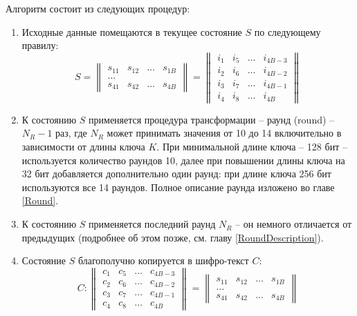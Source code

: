     Алгоритм состоит из следующих процедур:
    \begin{enumerate}
        \item Исходные данные помещаются в текущее состояние $S$ по следующему правилу:
            \begin{equation}
                S =
                \begin{Vmatrix}
                    s_{11} & s_{12} & \dots & s_{1B} \\
                    \dots \\
                    s_{41} & s_{42} & \dots & s_{4B}
                \end{Vmatrix} =
                \begin{Vmatrix}
                    i_{1} & i_{5} & \dots & i_{4B - 3} \\
                    i_{2} & i_{6} & \dots & i_{4B - 2} \\
                    i_{3} & i_{7} & \dots & i_{4B - 1} \\
                    i_{4} & i_{8} & \dots & i_{4B}
                \end{Vmatrix}
            \end{equation}

        \item К состоянию $S$ применяется процедура трансформации -- раунд (round) --  $N_R - 1$ раз,
        где $N_R$ может принимать значения от 10 до 14 включительно в зависимости от длины ключа $K$.
        При минимальной длине ключа -- 128 бит -- используется количество раундов 10, далее при повышении
        длины ключа на 32 бит добавляется дополнительно один раунд: при длине ключа 256 бит
        используются все 14 раундов. Полное описание раунда изложено во главе \ref{Round}.

        \item К состоянию $S$ применяется последний раунд $N_R$ -- он немного отличается от предыдущих
        (подробнее об этом позже, см. главу \ref{RoundDescription}).

        \item Состояние $S$ благополучно копируется в шифро-текст $C$:
        \begin{equation}
            C:
            \begin{Vmatrix}
                c_{1} & c_{5} & \dots & c_{4B - 3} \\
                c_{2} & c_{6} & \dots & c_{4B - 2} \\
                c_{3} & c_{7} & \dots & c_{4B - 1} \\
                c_{4} & c_{8} & \dots & c_{4B}
            \end{Vmatrix} =
            \begin{Vmatrix}
                s_{11} & s_{12} & \dots & s_{1B} \\
                \dots \\
                s_{41} & s_{42} & \dots & s_{4B}
            \end{Vmatrix}
        \end{equation}
    \end{enumerate}

